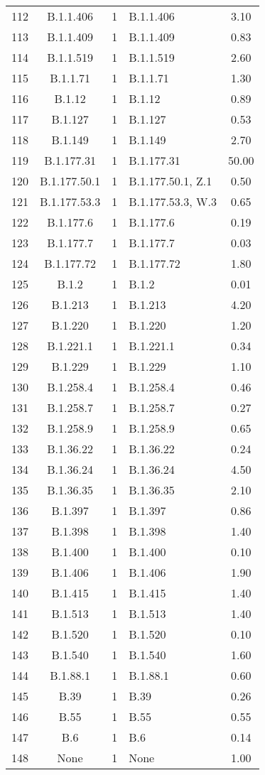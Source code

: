 \begin{longtable}[l]{cccP{4cm}c}
  112 & B.1.1.406 &   1 & B.1.1.406 & 3.10 \\ 
  113 & B.1.1.409 &   1 & B.1.1.409 & 0.83 \\ 
  114 & B.1.1.519 &   1 & B.1.1.519 & 2.60 \\ 
  115 & B.1.1.71 &   1 & B.1.1.71 & 1.30 \\ 
  116 & B.1.12 &   1 & B.1.12 & 0.89 \\ 
  117 & B.1.127 &   1 & B.1.127 & 0.53 \\ 
  118 & B.1.149 &   1 & B.1.149 & 2.70 \\ 
  119 & B.1.177.31 &   1 & B.1.177.31 & 50.00 \\ 
  120 & B.1.177.50.1 &   1 & B.1.177.50.1, Z.1 & 0.50 \\ 
  121 & B.1.177.53.3 &   1 & B.1.177.53.3, W.3 & 0.65 \\ 
  122 & B.1.177.6 &   1 & B.1.177.6 & 0.19 \\ 
  123 & B.1.177.7 &   1 & B.1.177.7 & 0.03 \\ 
  124 & B.1.177.72 &   1 & B.1.177.72 & 1.80 \\ 
  125 & B.1.2 &   1 & B.1.2 & 0.01 \\ 
  126 & B.1.213 &   1 & B.1.213 & 4.20 \\ 
  127 & B.1.220 &   1 & B.1.220 & 1.20 \\ 
  128 & B.1.221.1 &   1 & B.1.221.1 & 0.34 \\ 
  129 & B.1.229 &   1 & B.1.229 & 1.10 \\ 
  130 & B.1.258.4 &   1 & B.1.258.4 & 0.46 \\ 
  131 & B.1.258.7 &   1 & B.1.258.7 & 0.27 \\ 
  132 & B.1.258.9 &   1 & B.1.258.9 & 0.65 \\ 
  133 & B.1.36.22 &   1 & B.1.36.22 & 0.24 \\ 
  134 & B.1.36.24 &   1 & B.1.36.24 & 4.50 \\ 
  135 & B.1.36.35 &   1 & B.1.36.35 & 2.10 \\ 
  136 & B.1.397 &   1 & B.1.397 & 0.86 \\ 
  137 & B.1.398 &   1 & B.1.398 & 1.40 \\ 
  138 & B.1.400 &   1 & B.1.400 & 0.10 \\ 
  139 & B.1.406 &   1 & B.1.406 & 1.90 \\ 
  140 & B.1.415 &   1 & B.1.415 & 1.40 \\ 
  141 & B.1.513 &   1 & B.1.513 & 1.40 \\ 
  142 & B.1.520 &   1 & B.1.520 & 0.10 \\ 
  143 & B.1.540 &   1 & B.1.540 & 1.60 \\ 
  144 & B.1.88.1 &   1 & B.1.88.1 & 0.60 \\ 
  145 & B.39 &   1 & B.39 & 0.26 \\ 
  146 & B.55 &   1 & B.55 & 0.55 \\ 
  147 & B.6 &   1 & B.6 & 0.14 \\ 
  148 & None &   1 & None & 1.00 \\ 
\hline
\end{longtable}
